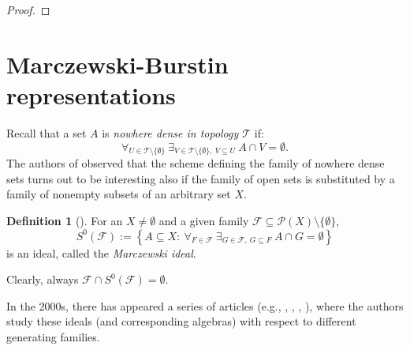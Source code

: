 \documentclass{amsart}
\theoremstyle{definition}
\newtheorem{df}[thm]{Definition}
\newcommand{\N}{{\mathbb N}}
\newcommand{\T}{\mathcal{T}}
\newcommand{\modulo}{\textrm{mod }}
\newcommand{\MB}{S^0}
\newcommand{\arithseq}[2]{\langle#2, #1\rangle}
\begin{document}
\begin{proof}
\end{proof}


\section{Marczewski-Burstin representations}

Recall that a set $A$ is \emph{nowhere dense in topology $\T$} if:
$$\forall_{U\in\T\setminus\{\emptyset\}}\ \exists_{V\in\T\setminus\{\emptyset\},\ V\subseteq U}\ A\cap V = \emptyset.$$
The authors of \cite{MB} observed that the scheme defining the family of nowhere dense sets turns out to be interesting also if the family of open sets is substituted by a family of nonempty subsets of an arbitrary set $X$.

\begin{df}[\cite{MB}] 
For an $X\neq\emptyset$ and a given family $\mathcal{F}\subseteq \mathcal{P}(X)\setminus\{\emptyset\}$,
$$\MB(\mathcal{F}) := \left\{A\subseteq X :\ \forall_{F\in\mathcal{F}}\ \exists_{G\in\mathcal{F},\ G\subseteq F}\ A\cap G=\emptyset\right\}$$
is an ideal, called the \emph{Marczewski ideal}.
\end{df}

Clearly, always $\mathcal{F}\cap \MB(\mathcal{F})=\emptyset$.

In the 2000s, there has appeared a series of articles (e.g., \cite{MB}, \cite{MB2}, \cite{MB3}, \cite{MB4}), where the authors study these ideals (and corresponding algebras) with respect to different generating families.
\end{document}
